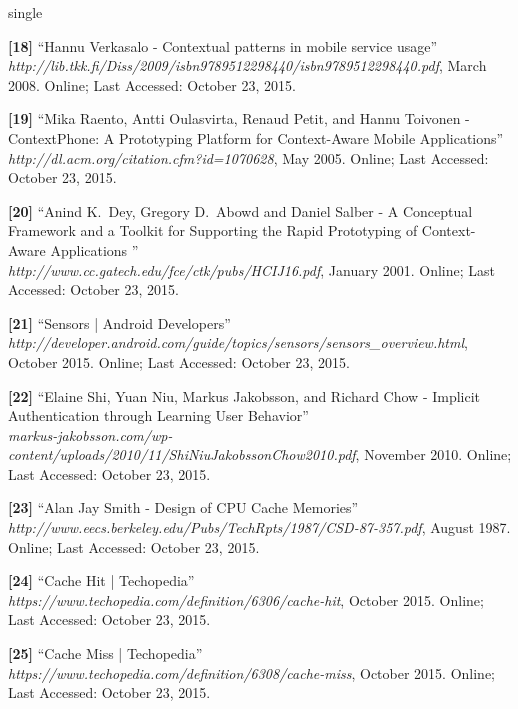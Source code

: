 \documentclass[12pt]{uthesis-v12}  %
\begin{document}
\begin{referencelist}{single}
	\item \textbf{[18]} ``Hannu Verkasalo - Contextual patterns in mobile service usage''
	\\\emph{http://lib.tkk.fi/Diss/2009/isbn9789512298440/isbn9789512298440.pdf}, March 2008. 
	Online; Last Accessed: October 23, 2015.
			
	\item \textbf{[19]} ``Mika Raento, Antti Oulasvirta, Renaud Petit, and Hannu Toivonen - ContextPhone: A Prototyping Platform for Context-Aware Mobile Applications''
	\\\emph{http://dl.acm.org/citation.cfm?id=1070628}, May 2005. 
	Online; Last Accessed: October 23, 2015.
	
	\item \textbf{[20]} ``Anind K.~Dey, Gregory D.~Abowd and Daniel Salber - A Conceptual Framework and a Toolkit for Supporting the Rapid Prototyping of Context-Aware Applications ''
	\\\emph{http://www.cc.gatech.edu/fce/ctk/pubs/HCIJ16.pdf}, January 2001. 
	Online; Last Accessed: October 23, 2015.
	
	\item \textbf{[21]} ``Sensors | Android Developers''
	\\\emph{http://developer.android.com/guide/topics/sensors/sensors\_overview.html}, October 2015. 
	Online; Last Accessed: October 23, 2015.
	
	\item \textbf{[22]} ``Elaine Shi, Yuan Niu, Markus Jakobsson, and Richard Chow - Implicit Authentication through Learning User Behavior''
	\\\emph{markus-jakobsson.com/wp-content/uploads/2010/11/ShiNiuJakobssonChow2010.pdf}, November 2010. 
	Online; Last Accessed: October 23, 2015.

	\item \textbf{[23]} ``Alan Jay Smith - Design of CPU Cache Memories''
	\\\emph{http://www.eecs.berkeley.edu/Pubs/TechRpts/1987/CSD-87-357.pdf}, August 1987. 
	Online; Last Accessed: October 23, 2015.
			
	\item \textbf{[24]} ``Cache Hit | Techopedia''
	\\\emph{https://www.techopedia.com/definition/6306/cache-hit}, October 2015. 
	Online; Last Accessed: October 23, 2015.
	
	\item \textbf{[25]} ``Cache Miss | Techopedia''
	\\\emph{https://www.techopedia.com/definition/6308/cache-miss}, October 2015. 
	Online; Last Accessed: October 23, 2015.	
									

\end{referencelist}
\end{document}
